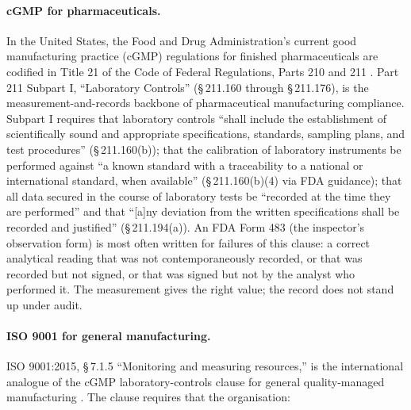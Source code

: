 \paragraph{cGMP for pharmaceuticals.} In the United States, the
Food and Drug Administration's current good manufacturing practice
(cGMP) regulations for finished pharmaceuticals are codified in
Title 21 of the Code of Federal Regulations, Parts 210 and 211
\cite{law:ch01t3b-21cfr210-211}. Part 211 Subpart I, ``Laboratory
Controls'' (\S\,211.160 through \S\,211.176), is the
measurement-and-records backbone of pharmaceutical manufacturing
compliance. Subpart I requires that laboratory controls
``shall include the establishment of scientifically sound and
appropriate specifications, standards, sampling plans, and test
procedures'' (\S\,211.160(b)); that the calibration of laboratory
instruments be performed against ``a known standard with a
traceability to a national or international standard, when
available'' (\S\,211.160(b)(4) via FDA guidance); that all data
secured in the course of laboratory tests be ``recorded at the
time they are performed'' and that ``[a]ny deviation from the
written specifications shall be recorded and justified''
(\S\,211.194(a)). An FDA Form 483 (the inspector's observation
form) is most often written for failures of this clause: a correct
analytical reading that was not contemporaneously recorded, or that
was recorded but not signed, or that was signed but not by the
analyst who performed it. The measurement gives the right value;
the record does not stand up under audit.

\paragraph{ISO 9001 for general manufacturing.} ISO 9001:2015,
\S\,7.1.5 ``Monitoring and measuring resources,'' is the
international analogue of the cGMP laboratory-controls clause for
general quality-managed manufacturing \cite{std:ch01t3b-iso9001-2015}.
The clause requires that the organisation:

